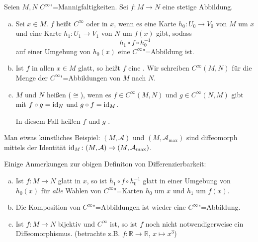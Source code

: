 \begin{definition}[{name=[Differenzierbarkeit von Abbildungen zwischen Mannigfaltigkeiten]}]
	Seien $M,N$ $C^\infty$"=Mannigfaltigkeiten. 
	Sei $f \colon M \to N$ eine stetige Abbildung.
	\begin{enumerate}[a)]
		\item Sei $x \in M$. 
		$f$ heißt $C^\infty$ oder  in $x$, wenn es eine Karte $h_0 \colon U_0 \to V_0$ von $M$ um $x$ und eine Karte $h_1 \colon U_1 \to V_1$ von $N$ um $f(x)$ gibt, sodass 
		\[
			h_1 \circ f \circ h_0 ^{-1}
		\]
		auf einer Umgebung von $h_0(x)$ eine $C^\infty$"=Abbildung ist.
		\item Ist $f$ in allen $x \in M$ glatt, so heißt $f$ eine . 
		Wir schreiben $C^\infty(M,N)$ für die Menge der $C^\infty$"=Abbildungen von $M$ nach $N$.
		\item $M$ und $N$ heißen  ($\cong$), wenn es $f \in C^\infty(M,N)$ und $g \in C^\infty(N,M)$ gibt mit $f \circ g = \operatorname{id}_N$ und $g \circ f = \operatorname{id}_M$. 
	
		In diesem Fall heißen $f$ und $g$ . 
	\end{enumerate}	
\end{definition}

Man etwas künstliches Beispiel:
$(M,\mathcal{A})$ und $(M, \mathcal{A}_\mathrm{max})$ sind diffeomorph mittels der Identität $\operatorname{id}_M \colon (M,\mathcal{A}) \to (M, \mathcal{A}_\mathrm{max})$.

\begin{bemerkung}[{name=[zur Definition von Differenzierbarkeit]}]
	Einige Anmerkungen zur obigen Definiton von Differenzierbarkeit:
	\begin{enumerate}[a)]
		\item Ist $f \colon M \to N$ glatt in $x$, so ist $h_1 \circ f \circ h_0 ^{-1}$ glatt in einer Umgebung von $h_0(x)$ für \emph{alle} Wahlen von $C^\infty$"=Karten $h_0$ um $x$ und $h_1$ um $f(x)$.
		\item Die Komposition von $C^\infty$"=Abbildungen ist wieder eine $C^\infty$"=Abbildung.
		\item Ist $f \colon M \to N$ bijektiv und $C^\infty$ ist, so ist $f$ noch nicht notwendigerweise ein Diffeomorphismus. (betrachte z.B. $f \colon \mathbb{R} \to \mathbb{R}$, $x \mapsto x^3$)
	\end{enumerate}
\end{bemerkung}

